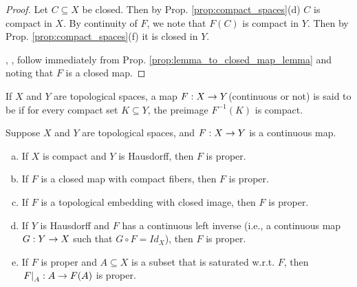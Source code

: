 \documentclass[11pt,a4paper]{article}
\begin{document}
\begin{proof}
 Let $C\subseteq X$ be closed. Then by Prop. \ref{prop:compact_spaces}(d) $C$ is compact in $X$. By continuity of $F$, we note that $F(C)$ is compact in $Y$. Then by Prop. \ref{prop:compact_spaces}(f) it is closed in $Y$. 

, ,  follow immediately from Prop. \ref{prop:lemma_to_closed_map_lemma} and noting that $F$ is a closed map.
\end{proof}

\begin{mydef}
If $X$ and $Y$ are topological spaces, a map $F:X\rightarrow Y$(continuous or not) is said to be  if for every compact set $K\subseteq Y$, the preimage $F^{-1}(K)$ is compact.
\end{mydef}

\begin{prop}
Suppose $X$ and $Y$ are topological spaces, and $F:X\rightarrow Y$ is a continuous map.
\begin{enumerate}[(a)]
    \item If $X$ is compact and $Y$ is Hausdorff, then $F$ is proper.
    \item If $F$ is a closed map with compact fibers, then $F$ is proper.
    \item If $F$ is a topological embedding with closed image, then $F$ is proper.
    \item If $Y$ is Hausdorff and $F$ has a continuous left inverse (i.e., a continuous map $G:Y\rightarrow X$ such that $G\circ F = Id_X$), then $F$ is proper.
    \item If $F$ is proper and $A\subseteq X$ is a subset that is saturated w.r.t. $F$, then $\left.F\right|_{A}:A\rightarrow F(A)$ is proper.
\end{enumerate}
\end{prop}
\end{document}
